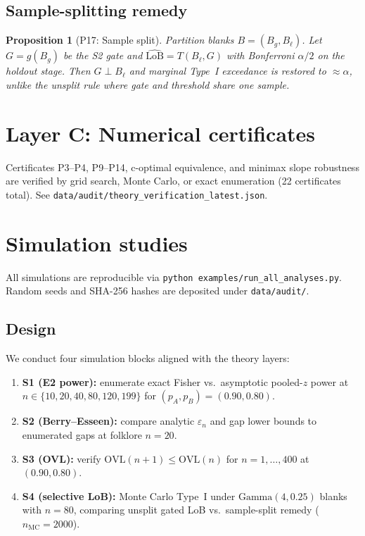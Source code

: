 \documentclass[11pt,a4paper]{article}
\newtheorem{proposition}[theorem]{Proposition}
\theoremstyle{definition}
\begin{document}
\subsection{Sample-splitting remedy}

\begin{proposition}[P17: Sample split]\label{thm:P17}
Partition blanks $B=(B_g,B_\ell)$. Let $G=g(B_g)$ be the S2 gate and
$\widehat{\mathrm{LoB}}=T(B_\ell,G)$ with Bonferroni $\alpha/2$ on the holdout stage.
Then $G\perp B_\ell$ and marginal Type~I exceedance is restored to $\approx\alpha$,
unlike the unsplit rule where gate and threshold share one sample.
\end{proposition}

\section{Layer C: Numerical certificates}
\label{sec:layerC}

Certificates P3--P4, P9--P14, c-optimal equivalence, and minimax slope robustness
are verified by grid search, Monte Carlo, or exact enumeration (22 certificates total).
See \texttt{data/audit/theory\_verification\_latest.json}.

\section{Simulation studies}
\label{sec:simulation}

All simulations are reproducible via \texttt{python examples/run\_all\_analyses.py}.
Random seeds and SHA-256 hashes are deposited under \texttt{data/audit/}.

\subsection{Design}

We conduct four simulation blocks aligned with the theory layers:
\begin{enumerate}
  \item \textbf{S1 (E2 power):} enumerate exact Fisher vs.\ asymptotic pooled-$z$
        power at $n\in\{10,20,40,80,120,199\}$ for $(p_A,p_B)=(0.90,0.80)$.
  \item \textbf{S2 (Berry--Esseen):} compare analytic $\varepsilon_n$ and gap lower
        bounds to enumerated gaps at folklore $n=20$.
  \item \textbf{S3 (OVL):} verify $\mathrm{OVL}(n+1)\le\mathrm{OVL}(n)$ for
        $n=1,\ldots,400$ at $(0.90,0.80)$.
  \item \textbf{S4 (selective LoB):} Monte Carlo Type~I under $\mathrm{Gamma}(4,0.25)$
        blanks with $n=80$, comparing unsplit gated LoB vs.\ sample-split remedy
        ($n_{\mathrm{MC}}=2000$).
\end{enumerate}
\end{document}
